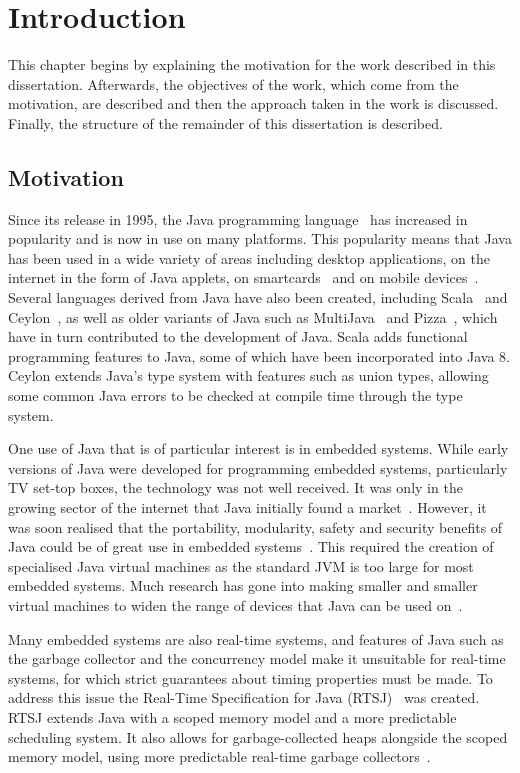 
\chapter{Introduction}

This chapter begins by explaining the motivation for the work
described in this dissertation.
Afterwards, the objectives of the work, which come from the
motivation, are described and then the approach taken in the work is
discussed. 
Finally, the structure of the remainder of this dissertation is
described.

\section{Motivation}

Since its release in 1995, the Java programming
language~\cite{gosling2013} has increased in popularity and is now in
use on many platforms.
This popularity means that Java has been used in a wide variety of
areas including desktop applications, on the internet in the form of
Java applets, on smartcards~\cite{chen2000} and on mobile
devices~\cite{oracle2014}.
Several languages derived from Java have also been created, including
Scala~\cite{lausanne2015} and Ceylon~\cite{redhat2015}, as well as
older variants of Java such as MultiJava~\cite{clifton2006} and
Pizza~\cite{odersky1997}, which have in turn contributed to the
development of Java.
Scala adds functional programming features to Java, some of which have
been incorporated into Java 8.
Ceylon extends Java's type system with features such as union types,
allowing some common Java errors to be checked at compile time through
the type system.

One use of Java that is of particular interest is in embedded systems.
While early versions of Java were developed for programming embedded
systems, particularly TV set-top boxes, the technology was not well
received.
It was only in the growing sector of the internet that Java initially
found a market~\cite{horstmann2002}.
However, it was soon realised that the portability, modularity, safety
and security benefits of Java could be of great use in embedded
systems~\cite{mulchandani1998}.
This required the creation of specialised Java virtual machines as the
standard JVM is too large for most embedded systems.
Much research has gone into making smaller and smaller virtual
machines to widen the range of devices that Java can be used
on~\cite{caska2011,thomm2010}.

Many embedded systems are also real-time systems, and features of Java
such as the garbage collector and the concurrency model make it
unsuitable for real-time systems, for which strict guarantees about
timing properties must be made.
To address this issue the Real-Time Specification for Java
(RTSJ)~\cite{gosling2000} was created.
RTSJ extends Java with a scoped memory model and a more predictable
scheduling system.
It also allows for garbage-collected heaps alongside the scoped memory
model, using more predictable real-time garbage collectors~\cite{schoeberl2006,schoeberl2010,wallace1993}.

